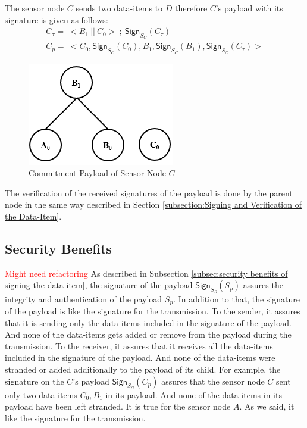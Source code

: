 	The sensor node $C$ sends two data-items to $D$ therefore $C$'s payload with its signature is given as follows:
	\begin{equation}
		\begin{array}{l}
		 	C_{\tau} =\ <B_{1}\ ||\ C_{0}>\ ;\ \textsf{Sign}_{S_{C}}(C_{\tau})\\
		 	C_{p} =\ <C_{0}, \textsf{Sign}_{S_{C}}(C_{0}), B_{1}, \textsf{Sign}_{S_{C}}(B_{1}), \textsf{Sign}_{S_{C}}(C_{\tau}) >
		\end{array}
	\end{equation}
	\begin{figure}[h!]
		\centering
		\includegraphics[scale = 1]{images/commitment-payload-of-C.png}
		\caption{Commitment Payload of Sensor Node $C$}
		\label{fig:Commitment payload of C}
	\end{figure}
	The verification of the received signatures of the payload is done by the parent node in the same way described in Section \ref{subsection:Signing and Verification of the Data-Item}.

	\subsection{Security Benefits}
		\textcolor{red}{Might need refactoring}
		As described in Subsection \ref{subsec:security benefits of signing the data-item}, the signature of the payload $\textsf{Sign}_{S_{S}}(S_{p})$ assures the integrity and authentication of the payload $S_{p}$.
		In addition to that, the signature of the payload is like the signature for the transmission.
		To the sender, it assures that it is sending only the data-items included in the signature of the payload.
		And none of the data-items gets added or remove from the payload during the transmission. 
		To the receiver, it assures that it receives all the data-items included in the signature of the payload. 
		And none of the data-items were stranded or added additionally to the payload of its child.
		For example, the signature on the $C$'s payload $\textsf{Sign}_{S_{C}}(C_{p})$ assures that the sensor node $C$ sent only two data-items $C_{0},B_{1}$ in its payload.
		And none of the data-items in its payload have been left stranded.
		It is true for the sensor node $A$.
		As we said, it like the signature for the transmission.

